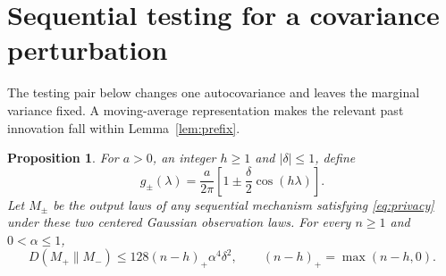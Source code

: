 \documentclass[11pt]{article}
\newtheorem{proposition}[theorem]{Proposition}
\theoremstyle{remark}
\newcommand{\KL}{D}
\begin{document}
\section{Sequential testing for a covariance perturbation}\label{sec:testing}

The testing pair below changes one autocovariance and leaves the marginal
variance fixed. A moving-average representation makes the relevant past
innovation fall within Lemma~\ref{lem:prefix}.

\begin{proposition}\label{prop:purelag}
For $a>0$, an integer $h\ge1$ and $|\delta|\le1$, define
\[
 g_\pm(\lambda)=\frac{a}{2\pi}
                 \left[1\pm\frac{\delta}{2}\cos(h\lambda)\right].
\]
Let $M_\pm$ be the output laws of any sequential mechanism satisfying
\eqref{eq:privacy} under these two centered Gaussian observation laws.
For every $n\ge1$ and $0<\alpha\le1$,
\begin{equation}\label{eq:purelag}
 \KL(M_+\|M_-)\le128(n-h)_+\alpha^4\delta^2,
 \qquad (n-h)_+=\max(n-h,0).
\end{equation}
\end{proposition}
\end{document}
